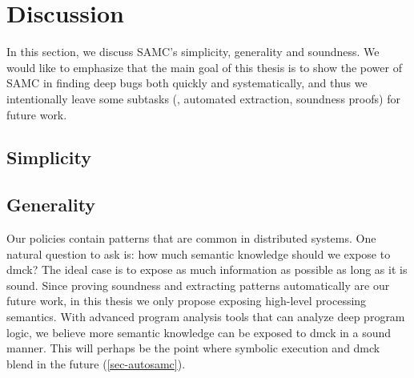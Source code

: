 
\section{Discussion}
\label{discuss}


In this section, we discuss SAMC's simplicity, generality and soundness.
We would like to emphasize that the main goal of this thesis is to show the
power of SAMC in finding deep bugs both quickly and systematically, and
thus we intentionally leave some subtasks (\eg, automated extraction,
soundness proofs) for future work.


\subsection{Simplicity}



\subsection{Generality}
\label{sam-general}

Our policies contain patterns that are common in distributed systems.  One
natural question to ask is: how much semantic knowledge should we expose to
dmck?  The ideal case is to expose as much information as possible as long
as it is sound.  Since proving soundness and extracting patterns
automatically are our future work, in this thesis we only propose exposing
high-level processing semantics.  With advanced program analysis tools that
can analyze deep program logic, we believe more semantic knowledge can be
exposed to dmck in a sound manner.
%
%
This will perhaps be the point where symbolic execution and
dmck blend in the future (\sec\ref{sec-autosamc}).


